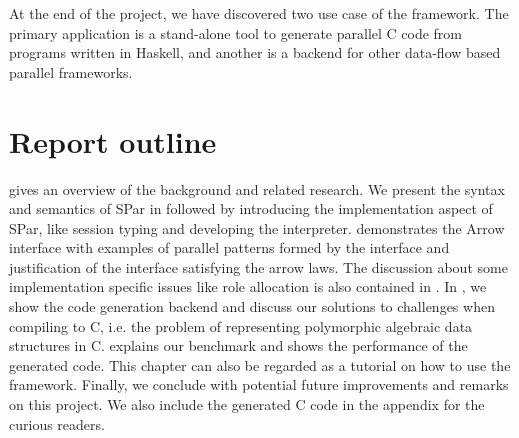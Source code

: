 At the end of the project, we have discovered two use case of the framework. The primary application is a stand-alone tool to generate parallel C code from programs written in Haskell, and another is a backend for other data-flow based parallel frameworks. 

\section{Report outline}

 gives an overview of the background and related research. We present the syntax and semantics of SPar in  followed by  introducing the implementation aspect of SPar, like session typing and developing the interpreter.  demonstrates the Arrow interface with examples of parallel patterns formed by the interface and justification of the interface satisfying the arrow laws. The discussion about some implementation specific issues like role allocation is also contained in . In , we show the code generation backend and discuss our solutions to challenges when compiling to C, i.e. the problem of representing polymorphic algebraic data structures in C.  explains our benchmark and shows the performance of the generated code. This chapter can also be regarded as a tutorial on how to use the framework. Finally, we conclude with potential future improvements and remarks on this project. We also include the generated C code in the appendix for the curious readers.